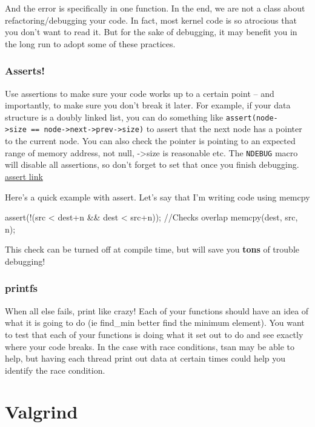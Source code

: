 And the error is specifically in one function. In the end, we are not a class about refactoring/debugging your code. In fact, most kernel code is so atrocious that you don't want to read it. But for the sake of debugging, it may benefit you in the long run to adopt some of these practices.

\subsubsection{Asserts!}\label{asserts}

Use assertions to make sure your code works up to a certain point -- and importantly, to make sure you don't break it later. For example, if your data structure is a doubly linked list, you can do something like \texttt{assert(node-\textgreater{}size\ ==\ node-\textgreater{}next-\textgreater{}prev-\textgreater{}size)} to assert that the next node has a pointer to the current node. You can also check the pointer is pointing to an expected range of memory address, not null, -\textgreater{}size is reasonable etc. The \texttt{NDEBUG} macro will disable all assertions, so don't forget to set that once you finish debugging. \href{http://www.cplusplus.com/reference/cassert/assert/}{assert link}

Here's a quick example with assert. Let's say that I'm writing code using memcpy

\begin{code}[language=C]
assert(!(src < dest+n && dest < src+n)); //Checks overlap
memcpy(dest, src, n);
\end{code}

This check can be turned off at compile time, but will save you \textbf{tons} of trouble debugging!

\subsubsection{printfs}\label{printfs}

When all else fails, print like crazy! Each of your functions should have an idea of what it is going to do (ie find\_min better find the minimum element). You want to test that each of your functions is doing what it set out to do and see exactly where your code breaks. In the case with race conditions, tsan may be able to help, but having each thread print out data at certain times could help you identify the race condition.

\section{Valgrind}\label{valgrind}

